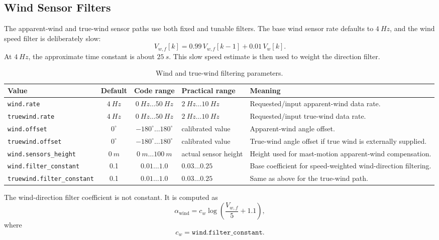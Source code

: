 \documentclass[10pt,twocolumn]{article}
\begin{document}
\subsection{Wind Sensor Filters}
The apparent-wind and true-wind sensor paths use both fixed and tunable
filters.  The base wind sensor rate defaults to \(\SI{4}{Hz}\), and the
wind speed filter is deliberately slow:
\[
V_{w,f}[k]
=
0.99\,V_{w,f}[k-1]
+
0.01\,V_w[k].
\]
At \(\SI{4}{Hz}\), the approximate time constant is about
\(\SI{25}{s}\).  This slow speed estimate is then used to weight the
direction filter.
\begin{table}[!tbp]
\centering
\caption{Wind and true-wind filtering parameters.}
\label{tab:pypilot-wind-filters}
\begin{tabularx}{\textwidth}{Z{0.23\textwidth}c c Z{0.16\textwidth}Y}
\toprule
Value & Default & Code range & Practical range & Meaning \\
\midrule
\texttt{wind.rate} &
\(\SI{4}{Hz}\) &
\(\SI{0}{Hz}\ldots\SI{50}{Hz}\) &
\(\SI{2}{Hz}\ldots\SI{10}{Hz}\) &
Requested/input apparent-wind data rate. \\
\texttt{truewind.rate} &
\(\SI{4}{Hz}\) &
\(\SI{0}{Hz}\ldots\SI{50}{Hz}\) &
\(\SI{2}{Hz}\ldots\SI{10}{Hz}\) &
Requested/input true-wind data rate. \\
\texttt{wind.offset} &
\(0^\circ\) &
\(-180^\circ\ldots180^\circ\) &
calibrated value &
Apparent-wind angle offset. \\
\texttt{truewind.offset} &
\(0^\circ\) &
\(-180^\circ\ldots180^\circ\) &
calibrated value &
True-wind angle offset if true wind is externally supplied. \\
\texttt{wind.sensors\_height} &
\(\SI{0}{m}\) &
\(\SI{0}{m}\ldots\SI{100}{m}\) &
actual sensor height &
Height used for mast-motion apparent-wind compensation. \\
\texttt{wind.filter\_constant} &
\num{0.1} &
\(\num{0.01}\ldots\num{1.0}\) &
\(\num{0.03}\ldots\num{0.25}\) &
Base coefficient for speed-weighted wind-direction filtering. \\
\texttt{truewind.filter\_constant} &
\num{0.1} &
\(\num{0.01}\ldots\num{1.0}\) &
\(\num{0.03}\ldots\num{0.25}\) &
Same as above for the true-wind path. \\
\bottomrule
\end{tabularx}
\end{table}
The wind-direction filter coefficient is not constant.  It is computed as
\[
\alpha_{\mathrm{wind}}
=
c_w
\log\left(\frac{V_{w,f}}{5}+1.1\right),
\]
where
\[
c_w = \texttt{wind.filter\_constant}.
\]
\end{document}
